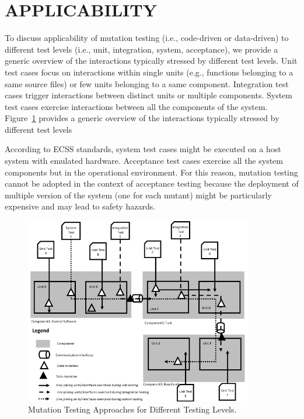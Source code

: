 
\STARTCHANGEDWPT
\section{APPLICABILITY}

To discuss applicability of mutation testing (i.e., code-driven or data-driven) to different test levels (i.e., unit, integration, system, acceptance), we provide a generic overview of the interactions typically stressed by different test levels. Unit test cases focus on interactions within single units (e.g., functions belonging to a same source files) or few units belonging to a same component. Integration test cases trigger interactions between distinct units or multiple components. System test cases exercise interactions between all the components of the system.
Figure~\ref{fig:mutationTestingVSTestingLevels} provides a generic overview of the interactions typically stressed by different test levels

According to ECSS standards, system test cases might be executed on a host system with emulated hardware. Acceptance test cases exercise all the system components but in the operational environment. For this reason, mutation testing cannot be adopted in the context of acceptance testing because the deployment of multiple version of the system (one for each mutant) might be particularly expensive and may lead to safety hazards.

\begin{figure}[h]
  \centering
    \includegraphics[width=10cm]{images/TestingLevels}
      \caption{Mutation Testing Approaches for Different Testing Levels.}
      \label{fig:mutationTestingVSTestingLevels}
\end{figure}

